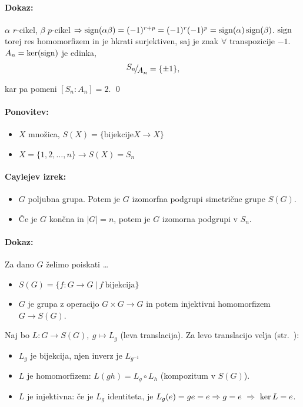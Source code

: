 \paragraph{Dokaz:}

$\alpha$ $r$-cikel, $\beta$ $p$-cikel $\Rightarrow \operatorname{sign}(\alpha \beta) = (-1)^{r + p} = (-1)^r (-1)^p = \operatorname{sign} (\alpha) \operatorname{sign} (\beta)$. $\operatorname{sign}$ torej res homomorfizem in je
hkrati surjektiven, saj je znak $\forall$ transpozicije $-1$. $A_n = \ker (\operatorname{sign})$ je edinka,
\[
	\quot{S_n}{A_n} = \{\pm 1\},
\]

\ni kar pa pomeni $[S_n : A_n] = 2$.
\qed

\paragraph{Ponovitev:}
\begin{itemize}
	\item{$X$ mno\v zica, $S(X) = \{\text{bijekcije} X \to X\}$}
	\item{$X = \{1, 2, \ldots, n\} \to S(X) = S_n$}
\end{itemize}

\begin{trditev}
	\paragraph{Caylejev izrek:}
	\begin{itemize}
		\item{$G$ poljubna grupa. Potem je $G$ izomorfna podgrupi simetri\v cne grupe $S(G)$.}
		\item{\v Ce je $G$ kon\v cna in $|G| = n$, potem je $G$ izomorna podgrupi v $S_n$.}
	\end{itemize}
\end{trditev}
\paragraph{Dokaz:} Za dano $G$ \v zelimo poiskati \ldots
\begin{itemize}
	\item{$S(G) = \{f: G \to G\ |\ f\ \text{bijekcija}\}$}
	\item{$G$ je grupa z operacijo $G\times G \to G$ in potem injektivni homomorfizem $G \to S(G)$.}
\end{itemize}

\ni Naj bo $L : G \to S(G),\ g \mapsto L_g$ (leva translacija). Za levo translacijo velja (str.~\pageref{translacija}):
\begin{itemize}
	\item{$L_g$ je bijekcija, njen inverz je $L_{g^{-1}}$}
	\item{$L$ je homomorfizem: $L(gh) = L_g \circ L_h$ \big(kompozitum v $S(G)$\big).}
	\item{$L$ je injektivna: \v ce je $L_g$ identiteta, je $L_g(e) = ge = e \then g = e\ \then\ \ker L = e$.}
\end{itemize}

